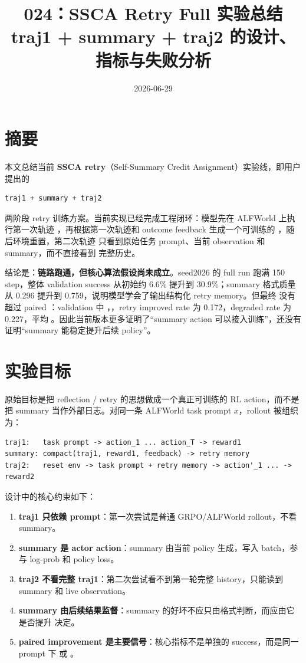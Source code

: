 \documentclass[10pt]{ctexart}
\title{024：SSCA Retry Full 实验总结\\\large traj1 + summary + traj2 的设计、指标与失败分析}
\author{}
\date{2026-06-29}
\begin{document}
\maketitle
\vspace{-1.2em}

\section*{摘要}
本文总结当前 \textbf{SSCA retry}（Self-Summary Credit Assignment）实验线，即用户提出的
\begin{lstlisting}
traj1 + summary + traj2
\end{lstlisting}
两阶段 retry 训练方案。当前实现已经完成工程闭环：模型先在 ALFWorld 上执行第一次轨迹 ，再根据第一次轨迹和 outcome feedback 生成一个可训练的 ，随后环境重置，第二次轨迹  只看到原始任务 prompt、当前 observation 和 summary，而不直接看到  完整历史。

结论是：\textbf{链路跑通，但核心算法假设尚未成立}。seed2026 的 full run 跑满 150 step，整体 validation success 从初始约 6.6\% 提升到 30.9\%；summary 格式质量从 0.296 提升到 0.759，说明模型学会了输出结构化 retry memory。但最终  没有超过 paired ：validation 中 ，，retry improved rate 为 0.172，degraded rate 为 0.227，平均 。因此当前版本更多证明了“summary action 可以接入训练”，还没有证明“summary 能稳定提升后续 policy”。

\section{实验目标}
原始目标是把 reflection / retry 的思想做成一个真正可训练的 RL action，而不是把 summary 当作外部日志。对同一条 ALFWorld task prompt $x$，rollout 被组织为：
\begin{lstlisting}
traj1:   task prompt -> action_1 ... action_T -> reward1
summary: compact(traj1, reward1, feedback) -> retry memory
traj2:   reset env -> task prompt + retry memory -> action'_1 ... -> reward2
\end{lstlisting}

设计中的核心约束如下：
\begin{enumerate}
  \item \textbf{traj1 只依赖 prompt}：第一次尝试是普通 GRPO/ALFWorld rollout，不看 summary。
  \item \textbf{summary 是 actor action}：summary 由当前 policy 生成，写入 batch，参与 log-prob 和 policy loss。
  \item \textbf{traj2 不看完整 traj1}：第二次尝试看不到第一轮完整 history，只能读到 summary 和 live observation。
  \item \textbf{summary 由后续结果监督}：summary 的好坏不应只由格式判断，而应由它是否提升  决定。
  \item \textbf{paired improvement 是主要信号}：核心指标不是单独的  success，而是同一 prompt 下  或 。
\end{enumerate}
\end{document}
